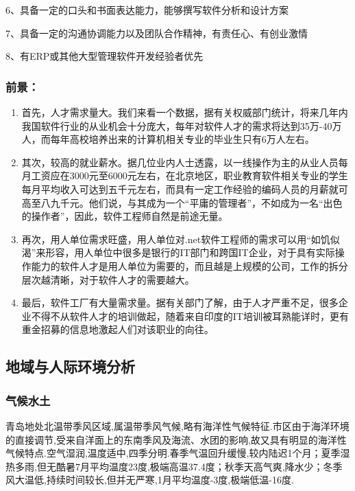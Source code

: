 \documentclass{article}
\begin{document}
          6、具备一定的口头和书面表达能力，能够撰写软件分析和设计方案 

          7、具备一定的沟通协调能力以及团队合作精神，有责任心、有创业激情 

          8、有ERP或其他大型管理软件开发经验者优先
	\subsubsection{ 前景：}

\begin{enumerate}[(1)]
	\item 首先，人才需求量大。我们来看一个数据，据有关权威部门统计，将来几年内我国软件行业的从业机会十分庞大，每年对软件人才的需求将达到35万-40万人，而每年高校培养出来的计算机相关专业的毕业生只有6万人左右。
	\item 其次，较高的就业薪水。据几位业内人士透露，以一线操作为主的从业人员每月工资应在3000元至6000元左右，在北京地区，职业教育软件相关专业的学生每月平均收入可达到五千元左右，而具有一定工作经验的编码人员的月薪就可高至八九千元。他们说，与其成为一个“平庸的管理者”，不如成为一名“出色的操作者”，因此，软件工程师自然是前途无量。
	\item 再次，用人单位需求旺盛，用人单位对.net软件工程师的需求可以用“如饥似渴”来形容，用人单位中很多是银行的IT部门和跨国IT企业，对于具有实际操作能力的软件人才是用人单位为需要的，而且越是上规模的公司，工作的拆分层次越清晰，对于软件人才的需要越大。
	\item 最后，软件工厂有大量需求量。据有关部门了解，由于人才严重不足，很多企业不得不从软件人才的培训做起，随着来自印度的IT培训被耳熟能详时，更有重金招募的信息地激起人们对该职业的向往。
\end{enumerate}
\par 
\par 

\subsection{地域与人际环境分析}
 
\subsubsection{气候水土}
    青岛地处北温带季风区域,属温带季风气候,略有海洋性气候特征.市区由于海洋环境的直接调节,受来自洋面上的东南季风及海流、水团的影响,故又具有明显的海洋性气候特点.空气湿润,温度适中,四季分明.春季气温回升缓慢,较内陆迟1个月；夏季湿热多雨,但无酷暑7月平均温度23度,极端高温37.4度；秋季天高气爽,降水少；冬季风大温低,持续时间较长,但并无严寒,1月平均温度-3度,极端低温-16度.
\end{document}
